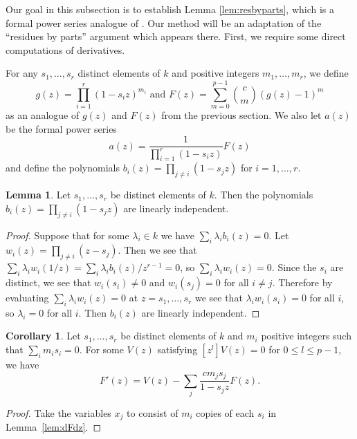 \documentclass{amsart}
\numberwithin{equation}{section}
\theoremstyle{definition}
\newtheorem{lemma}[theorem]{Lemma}
\newtheorem{corollary}[theorem]{Corollary}
\begin{document}
Our goal in this subsection is to establish Lemma \ref{lem:resbyparts}, which is a formal power series analogue of \cite[Lemma 3.4]{CE}.  Our method will be an adaptation of the ``residues by parts'' argument which appears there.  First, we require some direct computations of derivatives.

For any $s_1,\dots,s_{r}$ distinct elements of $k$ and positive integers $m_1,\dots,m_r$, we define 
\[
g(z)=\prod_{i=1}^{r} (1-s_iz)^{m_i} \text{  and } F(z)=\sum_{m=0}^{p-1} \binom{c}{m}(g(z)-1)^m
\]
as an analogue of $g(z)$ and $F(z)$ from the previous section. We also let $a(z)$ be the formal power series
\[
a(z)=\frac{1}{\prod_{i=1}^{r}(1-s_iz)}F(z)
\]
and define the polynomials $b_i(z) = \prod_{j \neq i} (1 - s_j z)$ for $i=1, \dots, r$. 

\begin{lemma}\label{lem:vand}Let $s_1, \ldots, s_{r }$ be distinct elements of $k$.  Then the polynomials $b_i(z) = \prod_{j \neq i} (1 - s_j z)$ are linearly independent.
\end{lemma}
\begin{proof}
Suppose that for some $\lambda_i \in k$ we have $\sum_i \lambda_ib_i(z)=0$. Let $w_i(z)= \prod_{j \neq i} (z-s_j)$. Then we see that $\sum_i \lambda_iw_i(1/z)=\sum_i \lambda_i b_i(z)/z^{r-1}=0$, so $\sum_i \lambda_i w_i(z)=0$. Since the $s_i$ are distinct, we see that $w_i(s_i) \ne 0$ and $w_i(s_j)=0$ for all $i \neq j$. Therefore by evaluating $\sum_i \lambda_i w_i(z)=0$ at $z=s_1,\dots,s_r$ we see that $\lambda_iw_i(s_i)=0$ for all $i$, so $\lambda_i=0$ for all $i$. Then $b_i(z)$ are linearly independent.
\end{proof}

\begin{corollary}\label{corr:dFdz2}
Let $s_1,\dots,s_{r}$ be distinct elements of $k$ and $m_i$ positive integers such that $\sum_i m_is_i=0$.  
For some $V(z)$ satisfying $[z^l]V(z)=0$ for $0 \le l \le p-1$, we have
\[
F'(z)=V(z) - \sum_j \frac{cm_js_j}{1-s_jz}F(z).
\]
\end{corollary}
\begin{proof}
Take the variables $x_j$ to consist of $m_i$ copies of each $s_i$ in Lemma~\ref{lem:dFdz}.
\end{proof}
\end{document}
